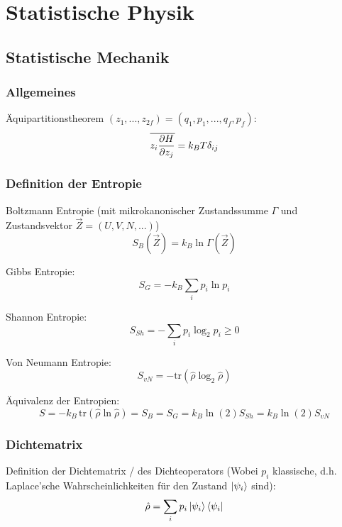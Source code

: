 \section{Statistische Physik}
	\subsection{Statistische Mechanik}
		\subsubsection{Allgemeines}
			\noindent
			Äquipartitionstheorem $(z_1,...,z_{2f}) = (q_1, p_1, ..., q_f, p_f)$:
			\begin{equation}
				\overline{ z_i \frac{\partial H}{\partial z_j}} = k_B T \delta_{ij}
			\end{equation}

		\subsubsection{Definition der Entropie}
			\noindent
			Boltzmann Entropie (mit mikrokanonischer Zustandssumme $\Gamma$ und Zustandsvektor $\vec{Z}=(U,V,N,...)$)
			\begin{equation}
				S_{B}(\vec{Z}) = k_B \ln\Gamma(\vec{Z})
			\end{equation}

			\noindent
			Gibbs Entropie:
			\begin{equation}
				S_{G} = -k_B \sum_i p_i \ln p_i
			\end{equation}

			\noindent
			Shannon Entropie:
			\begin{equation}
				S_{Sh} = -\sum_i p_i\log_2{p_i} \ge 0
			\end{equation}

			\noindent
			Von Neumann Entropie:
			\begin{equation}
				S_{vN} = -\mathrm{tr}(\hat{\rho}\log_2\hat{\rho})
			\end{equation}

			\noindent
			Äquivalenz der Entropien:
			\begin{equation}
				S = -k_B\,\mathrm{tr}(\hat{\rho} \ln \hat{\rho}) = S_B = S_G = k_B\ln(2) S_{Sh} = k_B\ln(2) S_{vN}
			\end{equation}

		\subsubsection{Dichtematrix}
			\noindent
			Definition der Dichtematrix / des Dichteoperators (Wobei $p_i$ klassische, d.h. Laplace'sche Wahrscheinlichkeiten für den Zustand $\Ket{\psi_i}$ sind):
			\begin{equation}
				\hat{\rho} = \sum_i p_i \Ket{\psi_i}\Bra{\psi_i}
			\end{equation}

